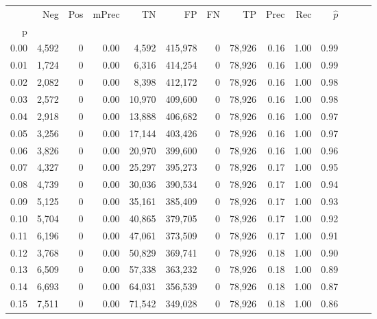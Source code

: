 \begin{tabular}{rrrrrrrrrrrrrr}
\toprule
{} &    Neg &    Pos & mPrec &       TN &       FP &      FN &      TP &  Prec &   Rec & $\hat{p}$ \\
p    &        &        &       &          &          &         &         &       &       &           \\
\midrule
0.00 &  4,592 &      0 &  0.00 &    4,592 &  415,978 &       0 &  78,926 &  0.16 &  1.00 &      0.99 \\
0.01 &  1,724 &      0 &  0.00 &    6,316 &  414,254 &       0 &  78,926 &  0.16 &  1.00 &      0.99 \\
0.02 &  2,082 &      0 &  0.00 &    8,398 &  412,172 &       0 &  78,926 &  0.16 &  1.00 &      0.98 \\
0.03 &  2,572 &      0 &  0.00 &   10,970 &  409,600 &       0 &  78,926 &  0.16 &  1.00 &      0.98 \\
0.04 &  2,918 &      0 &  0.00 &   13,888 &  406,682 &       0 &  78,926 &  0.16 &  1.00 &      0.97 \\
0.05 &  3,256 &      0 &  0.00 &   17,144 &  403,426 &       0 &  78,926 &  0.16 &  1.00 &      0.97 \\
0.06 &  3,826 &      0 &  0.00 &   20,970 &  399,600 &       0 &  78,926 &  0.16 &  1.00 &      0.96 \\
0.07 &  4,327 &      0 &  0.00 &   25,297 &  395,273 &       0 &  78,926 &  0.17 &  1.00 &      0.95 \\
0.08 &  4,739 &      0 &  0.00 &   30,036 &  390,534 &       0 &  78,926 &  0.17 &  1.00 &      0.94 \\
0.09 &  5,125 &      0 &  0.00 &   35,161 &  385,409 &       0 &  78,926 &  0.17 &  1.00 &      0.93 \\
0.10 &  5,704 &      0 &  0.00 &   40,865 &  379,705 &       0 &  78,926 &  0.17 &  1.00 &      0.92 \\
0.11 &  6,196 &      0 &  0.00 &   47,061 &  373,509 &       0 &  78,926 &  0.17 &  1.00 &      0.91 \\
0.12 &  3,768 &      0 &  0.00 &   50,829 &  369,741 &       0 &  78,926 &  0.18 &  1.00 &      0.90 \\
0.13 &  6,509 &      0 &  0.00 &   57,338 &  363,232 &       0 &  78,926 &  0.18 &  1.00 &      0.89 \\
0.14 &  6,693 &      0 &  0.00 &   64,031 &  356,539 &       0 &  78,926 &  0.18 &  1.00 &      0.87 \\
0.15 &  7,511 &      0 &  0.00 &   71,542 &  349,028 &       0 &  78,926 &  0.18 &  1.00 &      0.86 \\

\end{tabular}
